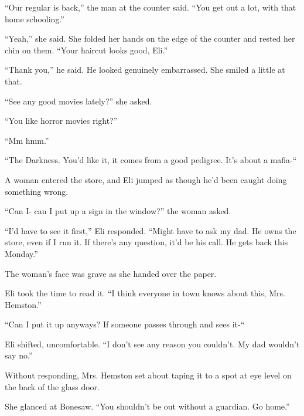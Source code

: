 ``Our regular is back,'' the man at the counter said.  ``You get out a lot, with that home schooling.''



``Yeah,'' she said.  She folded her hands on the edge of the counter and rested her chin on them.  ``Your haircut looks good, Eli.''



``Thank you,'' he said.  He looked genuinely embarrassed.  She smiled a little at that.



``See any good movies lately?'' she asked.



``You like horror movies right?''



``Mm hmm.''



``The Darkness.  You'd like it, it comes from a good pedigree.  It's about a mafia-``



A woman entered the store, and Eli jumped as though he'd been caught doing something wrong.



``Can I- can I put up a sign in the window?'' the woman asked.



``I'd have to see it first,'' Eli responded.  ``Might have to ask my dad.  He owns the store, even if I run it.  If there's any question, it'd be his call.  He gets back this Monday.''



The woman's face was grave as she handed over the paper.



Eli took the time to read it.  ``I think everyone in town knows about this, Mrs. Hemston.''



``Can I put it up anyways?  If someone passes through and sees it-``



Eli shifted, uncomfortable.  ``I don't see any reason you couldn't.  My dad wouldn't say no.''



Without responding, Mrs. Hemston set about taping it to a spot at eye level on the back of the glass door.



She glanced at Bonesaw.  ``You shouldn't be out without a guardian.  Go home.''



